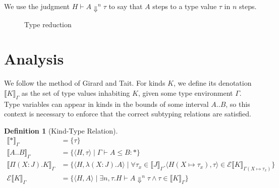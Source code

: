 \documentclass[a4paper, 10pt]{article}
\newcommand{\interval}[2]{#1 .. #2}
\newcommand{\TyKd}{*}
\newcommand{\KDepArr}[3]{\Pi(#1:#2).#3}
\newcommand{\isval}[1]{#1\ \texttt{val}}
\newcommand{\stepsn}[1][]{\Downarrow^{#1}}
\newcommand{\KDenot}[2][\Gamma]{\llbracket #2 \rrbracket_{#1}}
\newcommand{\KEval}[2][\Gamma]{\mathscr{E}\llbracket #2 \rrbracket_{#1}}
\newtheorem{defn}{Definition}
\begin{document}
We use the judgment $H \vdash A \stepsn[n] \tau$ to say that $A$ steps to a
type value $\tau$ in $n$ steps.

\begin{figure}[ht]

  \caption{Type reduction}
\end{figure}

\section{Analysis}

We follow the method of Girard and Tait. For kinds $K$, we define its
denotation $\KDenot{K}$ as the set of type values inhabiting $K$, given some
type environment $\Gamma$. Type variables can appear in kinds in the bounds of
some interval $\interval{A}{B}$, so this context is necessary to enforce that
the correct subtyping relations are satisfied.

\begin{defn}[Kind-Type Relation]
  \begin{align*}
    \KDenot{\TyKd} &= \{ \tau \} \\
    \KDenot{\interval{A}{B}} &=
      \{ \langle H, \tau \rangle \mid
         \Gamma \vdash A \le B : \TyKd
      \} \\
    \KDenot{\KDepArr{X}{J}{K}} &=
      \{ \langle H, \lambda(X:J).A \rangle \mid
         \forall \tau_x \in \KDenot{J} .
           \langle H(X \mapsto \tau_x), \tau \rangle \in
           \KEval[\Gamma(X \mapsto \tau_x)]{K}
      \} \\
    \KEval{K} &=
      \{ \langle H, A \rangle \mid
         \exists n, \tau .
           H \vdash A \stepsn[n] \tau \land
           \tau \in \KDenot{K}
      \}
  \end{align*}
\end{defn}
\end{document}
